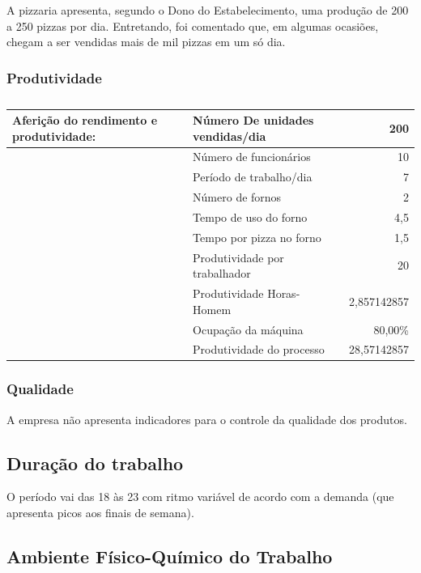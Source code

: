 \documentclass[11pt]{article}
\begin{document}
A pizzaria apresenta, segundo o Dono do Estabelecimento, uma produção de 200 a 250 pizzas por dia. Entretando, foi comentado que, em algumas ocasiões, chegam a ser vendidas mais de mil pizzas em um só dia.

\subsubsection{Produtividade}

\begin{table}[htbp]
\caption{}
\begin{tabular}{|l|l|r|}
\hline
Aferição do rendimento e produtividade: & Número De unidades vendidas/dia & 200 \\ \hline
 & Número de funcionários & 10 \\ \hline
 & Período de trabalho/dia & 7 \\ \hline
 & Número de fornos & 2 \\ \hline
 & Tempo de uso do forno & 4,5 \\ \hline
 & Tempo por pizza no forno & 1,5 \\ \hline
 & Produtividade por trabalhador & 20 \\ \hline
 & Produtividade Horas-Homem & 2,857142857 \\ \hline
 & Ocupação da máquina & 80,00\% \\ \hline
 & Produtividade do processo & 28,57142857 \\ \hline
\end{tabular}
\label{}
\end{table}

\newpage{}

\subsubsection{Qualidade}

A empresa não apresenta indicadores para o controle da qualidade dos produtos. 

\subsection{Duração do trabalho}

O período vai das 18 às 23 com ritmo variável de acordo com a demanda (que apresenta picos aos finais de semana).


\subsection{Ambiente Físico-Químico do Trabalho}
\end{document}
